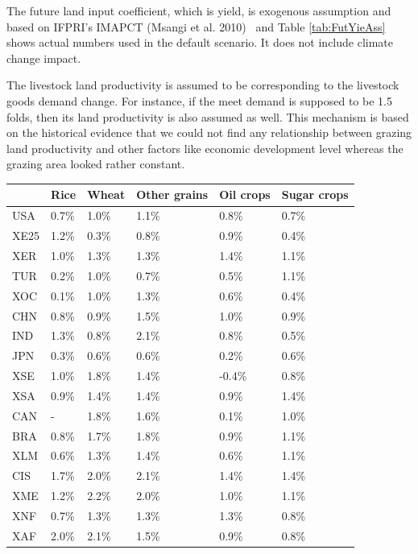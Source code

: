 \documentclass[10pt,a4paper,titlepage,dvipdfmx]{book}
\begin{document}
The future land input coefficient, which is yield, is exogenous assumption and based on IFPRI's IMAPCT (Msangi et al. 2010)~\cite{RN2538} and Table \ref{tab:FutYieAss} shows actual numbers used in the default scenario. It does not include climate change impact.

The livestock land productivity is assumed to be corresponding to the livestock goods demand change. For instance, if the meet demand is supposed to be 1.5 folds, then its land productivity is also assumed as well. This mechanism is based on the historical evidence that we could not find any relationship between grazing land productivity and other factors like economic development level whereas the grazing area looked rather constant.


\begin{tabularx}{\textwidth}{|
p{}|
p{}|
p{}|
p{}|
p{}|
p{}|} 
\caption{\label{tab:FutYieAss}Future yield assumptions}\\
\hline 
 & Rice & Wheat & Other grains & Oil crops & Sugar crops \\\hline 
USA & 0.7\% & 1.0\% & 1.1\% & 0.8\% & 0.7\% \\\hline 
XE25 & 1.2\% & 0.3\% & 0.8\% & 0.9\% & 0.4\% \\\hline 
XER & 1.0\% & 1.3\% & 1.3\% & 1.4\% & 1.1\% \\\hline 
TUR & 0.2\% & 1.0\% & 0.7\% & 0.5\% & 1.1\% \\\hline 
XOC & 0.1\% & 1.0\% & 1.3\% & 0.6\% & 0.4\% \\\hline 
CHN & 0.8\% & 0.9\% & 1.5\% & 1.0\% & 0.9\% \\\hline 
IND & 1.3\% & 0.8\% & 2.1\% & 0.8\% & 0.5\% \\\hline 
JPN & 0.3\% & 0.6\% & 0.6\% & 0.2\% & 0.6\% \\\hline 
XSE & 1.0\% & 1.8\% & 1.4\% & -0.4\% & 0.8\% \\\hline 
XSA & 0.9\% & 1.4\% & 1.4\% & 0.9\% & 1.4\% \\\hline 
CAN & - & 1.8\% & 1.6\% & 0.1\% & 1.0\% \\\hline 
BRA & 0.8\% & 1.7\% & 1.8\% & 0.9\% & 1.1\% \\\hline 
XLM & 0.6\% & 1.3\% & 1.4\% & 0.6\% & 1.1\% \\\hline 
CIS & 1.7\% & 2.0\% & 2.1\% & 1.4\% & 1.4\% \\\hline 
XME & 1.2\% & 2.2\% & 2.0\% & 1.0\% & 1.1\% \\\hline 
XNF & 0.7\% & 1.3\% & 1.3\% & 1.3\% & 0.8\% \\\hline 
XAF & 2.0\% & 2.1\% & 1.5\% & 0.9\% & 0.8\% \\\hline 
\end{tabularx}
\end{document}
